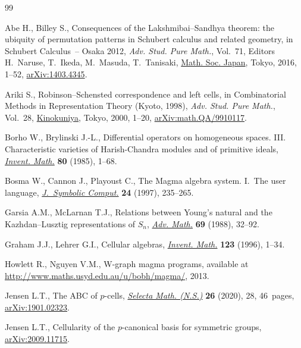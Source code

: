 \documentclass[10pt,a4paper]{amsart}
\numberwithin{equation}{section}
\begin{document}
\begin{thebibliography}{99}
\footnotesize\itemsep=0pt

Abe H., Billey S., Consequences of the {L}akshmibai--{S}andhya theorem: the
 ubiquity of permutation patterns in {S}chubert calculus and related geometry,
 in Schubert Calculus~-- {O}saka 2012, \textit{Adv. Stud. Pure Math.},
 Vol.~71, Editors H.~Naruse, T.~Ikeda, M.~Masuda, T.~Tanisaki, \href{https://doi.org/10.2969/aspm/07110001}{Math. Soc.
 Japan}, Tokyo, 2016, 1--52, \href{https://arxiv.org/abs/1403.4345}{arXiv:1403.4345}.

Ariki S., Robinson--{S}chensted correspondence and left cells, in Combinatorial
 Methods in Representation Theory ({K}yoto, 1998), \textit{Adv. Stud. Pure
 Math.}, Vol.~28, \href{https://doi.org/10.2969/aspm/02810001}{Kinokuniya}, Tokyo, 2000, 1--20, \href{https://arxiv.org/abs/math.QA/9910117}{arXiv:math.QA/9910117}.

Borho W., Brylinski J.-L., Differential operators on homogeneous spaces. {III}.
 {C}haracteristic varieties of {H}arish-{C}handra modules and of primitive
 ideals, \href{https://doi.org/10.1007/BF01388547}{\textit{Invent. Math.}} \textbf{80} (1985), 1--68.

Bosma W., Cannon J., Playoust C., The {M}agma algebra system. {I}.~{T}he user
 language, \href{https://doi.org/10.1006/jsco.1996.0125}{\textit{J.~Symbolic Comput.}} \textbf{24} (1997), 235--265.

Garsia A.M., McLarnan T.J., Relations between {Y}oung's natural and the
 {K}azhdan--{L}usztig representations of {$S_n$}, \href{https://doi.org/10.1016/0001-8708(88)90060-6}{\textit{Adv. Math.}}
 \textbf{69} (1988), 32--92.

Graham J.J., Lehrer G.I., Cellular algebras, \href{https://doi.org/10.1007/BF01232365}{\textit{Invent. Math.}}
 \textbf{123} (1996), 1--34.

Howlett R., Nguyen V.M., W-graph magma programs, {a}vailable at
 \url{http://www.maths.usyd.edu.au/u/bobh/magma/}, 2013.

Jensen L.T., The {ABC} of {$p$}-cells, \href{https://doi.org/10.1007/s00029-020-0552-1}{\textit{Selecta Math. (N.S.)}}
 \textbf{26} (2020), 28, 46~pages, \href{https://arxiv.org/abs/1901.02323}{arXiv:1901.02323}.

Jensen L.T., Cellularity of the $p$-canonical basis for symmetric groups,
 \href{https://arxiv.org/abs/2009.11715}{arXiv:2009.11715}.


\end{thebibliography}
\end{document}
